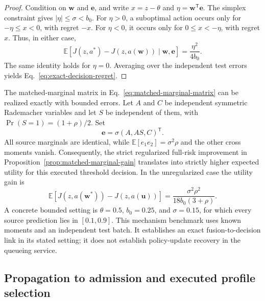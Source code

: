 \begin{proof}
Condition on $\boldsymbol w$ and $\boldsymbol e$, and write
$x=z-\theta$ and $\eta=\boldsymbol w^{\mathsf T}\boldsymbol e$.
The simplex constraint gives $|\eta|\le\sigma<b_0$.
For $\eta>0$, a suboptimal action occurs only for $-\eta\le x<0$, with
regret $-x$. For $\eta<0$, it occurs only for $0\le x<-\eta$, with regret
$x$. Thus, in either case,
\begin{equation}
 \mathbb E[J(z,a^*)-J(z,a(\boldsymbol w))\mid\boldsymbol w,\boldsymbol e]
 =\frac{\eta^2}{4b_0}.
\end{equation}
The same identity holds for $\eta=0$. Averaging over the independent test
errors yields Eq.~\eqref{eq:exact-decision-regret}.
\end{proof}

The matched-marginal matrix in Eq.~\eqref{eq:matched-marginal-matrix} can
be realized exactly with bounded errors. Let $A$ and $C$ be independent
symmetric Rademacher variables and let $S$ be independent of them, with
$\Pr(S=1)=(1+\rho)/2$. Set
\begin{equation}
 \boldsymbol e=\sigma(A,AS,C)^{\mathsf T}.
\end{equation}
All source marginals are identical, while
$\mathbb E[e_1e_2]=\sigma^2\rho$ and the other cross moments vanish.
Consequently, the strict regularized full-risk improvement in
Proposition~\ref{prop:matched-marginal-gain} translates into strictly
higher expected utility for this executed threshold decision. In the
unregularized case the utility gain is
\begin{equation}
 \mathbb E[J(z,a(\boldsymbol w^*))-J(z,a(\boldsymbol u))]
 =\frac{\sigma^2\rho^2}{18b_0(3+\rho)}.
\end{equation}
A concrete bounded setting is $\theta=0.5$, $b_0=0.25$, and
$\sigma=0.15$, for which every source prediction lies in $[0.1,0.9]$.
This mechanism benchmark uses known moments and an independent test batch.
It establishes an exact fusion-to-decision link in its stated setting;
it does not establish policy-update recovery in the queueing service.


\subsection{Propagation to admission and executed profile selection}
\label{sec:downstream-sensitivity}

